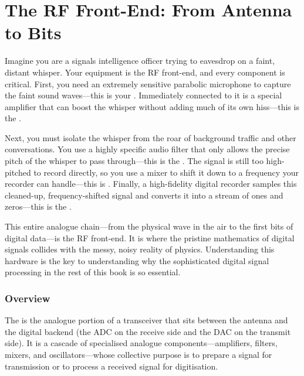 

\chapter{The RF Front-End: From Antenna to Bits}
\label{ch:rf-front-end}

\begin{nontechnical}
    Imagine you are a signals intelligence officer trying to eavesdrop on a faint, distant whisper. Your equipment is the RF front-end, and every component is critical. First, you need an extremely sensitive parabolic microphone to capture the faint sound waves—this is your . Immediately connected to it is a special amplifier that can boost the whisper without adding much of its own hiss—this is the .

    Next, you must isolate the whisper from the roar of background traffic and other conversations. You use a highly specific audio filter that only allows the precise pitch of the whisper to pass through—this is the . The signal is still too high-pitched to record directly, so you use a mixer to shift it down to a frequency your recorder can handle—this is . Finally, a high-fidelity digital recorder samples this cleaned-up, frequency-shifted signal and converts it into a stream of ones and zeros—this is the .

    This entire analogue chain—from the physical wave in the air to the first bits of digital data—is the RF front-end. It is where the pristine mathematics of digital signals collides with the messy, noisy reality of physics. Understanding this hardware is the key to understanding why the sophisticated digital signal processing in the rest of this book is so essential.
\end{nontechnical}

\subsection{Overview}

The  is the analogue portion of a transceiver that sits between the antenna and the digital backend (the ADC on the receive side and the DAC on the transmit side). It is a cascade of specialised analogue components—amplifiers, filters, mixers, and oscillators—whose collective purpose is to prepare a signal for transmission or to process a received signal for digitisation.

